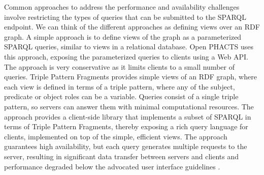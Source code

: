 Common approaches to address the performance and availability challenges involve restricting the types of queries that can be submitted to the SPARQL endpoint.
We can think of the different approaches as defining views over an RDF graph.
A simple approach is to define views of the graph as a parameterized SPARQL queries, similar to views in a relational database.
Open PHACTS uses this approach, exposing the parameterized queries to clients using a Web API.
The approach is very conservative as it limits clients to a small number of queries.
%
Triple Pattern Fragments \cite{Verborgh2014} provides simple views of an RDF graph, where each view is defined in terms of a triple pattern, where any of the subject, predicate or object roles can be a variable.
Queries consist of a single triple pattern, so servers can answer them with minimal computational resources.
The approach provides a client-side library that implements a subset of SPARQL in terms of Triple Pattern Fragments, thereby exposing a rich query language for clients, implemented on top of the simple, efficient views.
The approach guarantees high availability, but each query generates multiple requests to the server, resulting in significant data transfer between servers and clients and performance degraded below the advocated user interface guidelines . 

